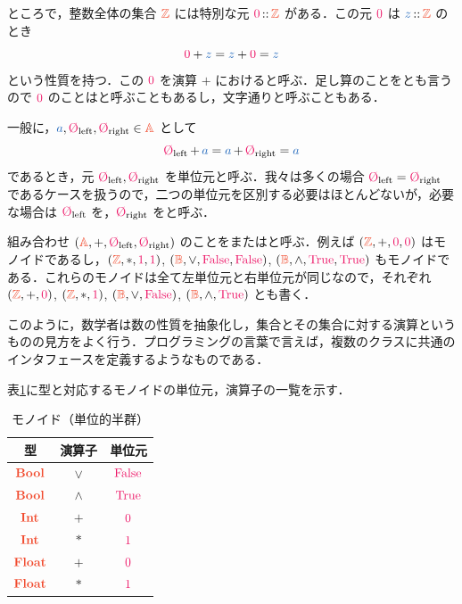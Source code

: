 \documentclass[a5paper,twoside,fleqn,draft]{jsbook}
\begin{document}
ところで，整数全体の集合 $\mZSet$ には特別な元 $\hConstant{0}\mIn\mZSet$ がある．この元 $\hConstant{0}$ は $\hVar{z}\mIn\mZSet$ のとき
\begin{equation}
  \hConstant{0}+\hVar{z}
  =\hVar{z}+\hConstant{0}
  =\hVar{z}
\end{equation}
という性質を持つ．この $\hConstant{0}$ を演算 $+$ におけると呼ぶ．足し算のことをとも言うので $\hConstant{0}$ のことはと呼ぶこともあるし，文字通りと呼ぶこともある．

一般に，$\hVar{a},\mZeroLeft,\mZeroRight\in\mASet$ として
\begin{equation}
  \label{eq:identity}
  \mZeroLeft\mPlus\hVar{a}
  =\hVar{a}\mPlus\mZeroRight
  =\hVar{a}
\end{equation}
であるとき，元 $\mZeroLeft,\mZeroRight$ を単位元と呼ぶ．我々は多くの場合 $\mZeroLeft=\mZeroRight$ であるケースを扱うので，二つの単位元を区別する必要はほとんどないが，必要な場合は $\mZeroLeft$ を，$\mZeroRight$ をと呼ぶ．

組み合わせ $\mTupleWith{\mASet,\mPlus,\mZeroLeft,\mZeroRight}$ のことをまたはと呼ぶ．例えば $\mTupleWith{\mZSet,+,\hConstant{0},\hConstant{0}}$ はモノイドであるし，$\mTupleWith{\mZSet,*,\hConstant{1},\hConstant{1}}$, $\mTupleWith{\mBSet,\mLogicalOr,\hFalse,\hFalse}$, $\mTupleWith{\mBSet,\mLogicalAnd,\hTrue,\hTrue}$ もモノイドである．これらのモノイドは全て左単位元と右単位元が同じなので，それぞれ $\mTupleWith{\mZSet,+,\hConstant{0}}$, $\mTupleWith{\mZSet,*,\hConstant{1}}$, $\mTupleWith{\mBSet,\mLogicalOr,\hFalse}$, $\mTupleWith{\mBSet,\mLogicalAnd,\hTrue}$ とも書く．

このように，数学者は数の性質を抽象化し，集合とその集合に対する演算というものの見方をよく行う．プログラミングの言葉で言えば，複数のクラスに共通のインタフェースを定義するようなものである．

表\ref{tab:monoids}に型と対応するモノイドの単位元，演算子の一覧を示す．

\begin{table}
\caption{モノイド（単位的半群）}
\label{tab:monoids}
\begin{center}
\begin{tabular}{||c||c|c||}
\hline 型&演算子&単位元\\\hline\hline
$\mBoolType$ &$\vee$&$\hFalse$\\\hline
$\mBoolType$ &$\wedge$ &$\hTrue$\\\hline\hline
$\mIntType$ &$+$ &$\hConstant{0}$\\\hline
$\mIntType$ &$*$ &$\hConstant{1}$\\\hline\hline
$\mFloatType$ &$+$ &$\hConstant{0}$\\\hline
$\mFloatType$ &$*$ &$\hConstant{1}$\\\hline
\end{tabular}
\end{center}
\end{table}
\end{document}
